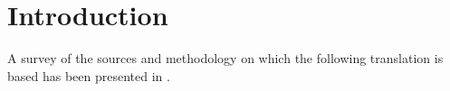 \chapter{Introduction}

A survey of the sources and methodology on which the following translation is based 
has been presented in \cite{wuja-2023}.